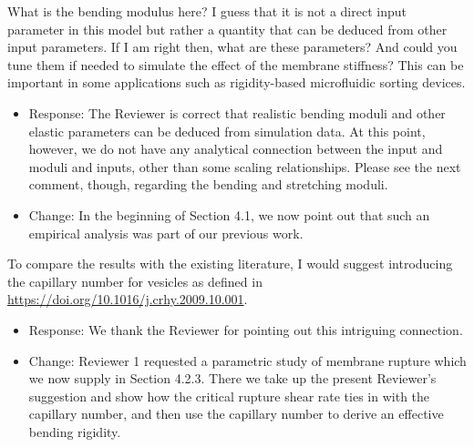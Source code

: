 \documentclass[11pt]{article}
\newcommand{\comment}[1]{{\color{blue} #1}}
\begin{document}
\noindent
\comment{What is the bending modulus here? I guess that it is not a
direct input parameter in this model but rather a quantity that can be
deduced from other input parameters. If I am right then, what are these
parameters? And could you tune them if needed to simulate the effect of
the membrane stiffness? This can be important in some applications such
as rigidity-based microfluidic sorting devices.}
\begin{itemize}
\item Response: The Reviewer is correct that realistic bending moduli
  and other elastic parameters can be deduced from simulation data.
  At this point, however, we do not have any analytical connection between
  the input and moduli and inputs, other than some scaling relationships.
  Please see the next comment, though, regarding the bending and stretching
  moduli.
\item Change: In the beginning of Section 4.1,
  we now point out that such an empirical analysis was part of our previous work.  
\end{itemize}

\noindent
\comment{To compare the results with the existing literature, I would
suggest introducing the capillary number for vesicles as defined in
\url{https://doi.org/10.1016/j.crhy.2009.10.001}.}
\begin{itemize}
\item Response:  We thank the Reviewer for pointing out this intriguing connection. 
\item Change:  Reviewer 1 requested a parametric study of membrane rupture which
  we now supply in Section 4.2.3. There we take up the present Reviewer's
  suggestion and show how the critical rupture shear rate ties in with the capillary
  number, and then use the capillary number to derive an effective bending rigidity. 
\end{itemize}
\end{document}

